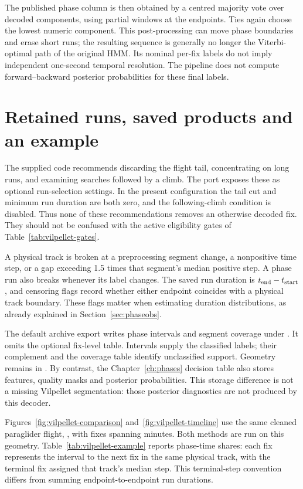 The published phase column is then obtained by a centred majority vote over
\VilpMajorityFixes{} decoded components, using partial windows at the endpoints.
Ties again choose the lowest numeric component. This post-processing can move phase
boundaries and erase short runs; the resulting sequence is generally no longer the
Viterbi-optimal path of the original HMM. Its nominal per-fix labels do not imply
independent one-second temporal resolution. The pipeline does not compute
forward--backward posterior probabilities for these final labels.

\section{Retained runs, saved products and an example}
\label{sec:vilpellet-example}
The supplied code recommends discarding the flight tail, concentrating on long runs,
and examining searches followed by a climb. The port exposes these as optional
run-selection settings. In the present configuration the tail cut and minimum run
duration are both zero, and the following-climb condition is disabled. Thus none
of these recommendations removes an otherwise decoded fix. They should not be
confused with the active eligibility gates of Table~\ref{tab:vilpellet-gates}.

A physical track is broken at a preprocessing segment change, a nonpositive time
step, or a gap exceeding 1.5 times that segment's median positive step. A phase run
also breaks whenever its label changes. The saved run duration is $t_{\rm end}-t_{\rm start}$,
and censoring flags record whether either endpoint coincides with a physical track
boundary. These flags matter when estimating duration distributions, as already
explained in Section~\ref{sec:phaseobs}.

The default archive export writes phase intervals and segment coverage under
. It omits the optional fix-level table.
Intervals supply the classified labels; their complement and the coverage table
identify unclassified support. Geometry remains in .
By contrast, the Chapter~\ref{ch:phases} decision table also stores features, quality
masks and posterior probabilities. This storage difference is not a missing
Vilpellet segmentation: those posterior diagnostics are not produced by this decoder.

Figures~\ref{fig:vilpellet-comparison} and~\ref{fig:vilpellet-timeline} use the same
cleaned paraglider flight, \texttt{\VilpExampleFlight}, with
\VilpExampleFixes{} fixes spanning \VilpExampleDurationMinutes{} minutes.
Both methods are run on this geometry. Table~\ref{tab:vilpellet-example} reports
phase-time shares: each fix represents the interval to the next fix in the same
physical track, with the terminal fix assigned that track's median step. This
terminal-step convention differs from summing endpoint-to-endpoint run durations.

